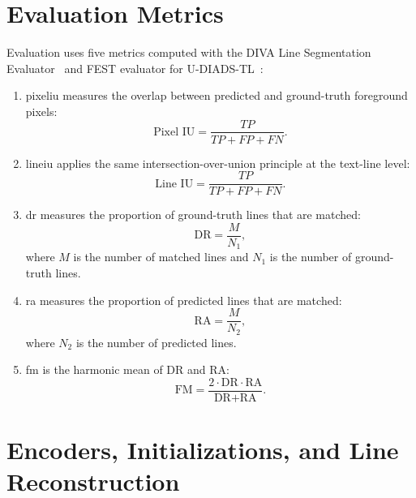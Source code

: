 \section{Evaluation Metrics}
\label{metrics}

Evaluation uses five metrics computed with the DIVA Line Segmentation Evaluator~\cite{diva_tool} and FEST evaluator for U-DIADS-TL~\cite{Zottin_2025_FEST}:

\begin{enumerate}
    \item \Gls{pixeliu} measures the overlap between predicted and ground-truth foreground pixels:
    \[\text{Pixel IU} = \frac{TP}{TP + FP + FN}.\]

    \item \Gls{lineiu} applies the same intersection-over-union principle at the text-line level:
    \[\text{Line IU} = \frac{TP}{TP + FP + FN}.\]
    
    \item \Gls{dr} measures the proportion of ground-truth lines that are matched:
    \[\text{DR} = \frac{M}{N_1},\]
    where $M$ is the number of matched lines and $N_1$ is the number of ground-truth lines.

    \item \Gls{ra} measures the proportion of predicted lines that are matched:
    \[\text{RA} = \frac{M}{N_2},\]
    where $N_2$ is the number of predicted lines.

    \item \Gls{fm} is the harmonic mean of DR and RA:
    \[\text{FM} = \frac{2\cdot\text{DR}\cdot\text{RA}}{\text{DR}+\text{RA}}.\]
\end{enumerate}

\begingroup
\raggedbottom
\setlength{\intextsep}{6pt}
\setlength{\floatsep}{6pt}
\setlength{\textfloatsep}{8pt}
\setlength{\LTpre}{6pt}
\setlength{\LTpost}{6pt}

\FloatBarrier

\section{Encoders, Initializations, and Line Reconstruction}
\label{sec:results-models}


